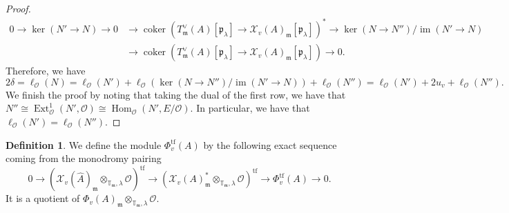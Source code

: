 \documentclass[a4paper, notitlepage, 10pt]{amsart}
\theoremstyle{plain} %
\theoremstyle{definition} %
\newtheorem{definition}[theorem]{Definition}
\theoremstyle{remark} %
\numberwithin{equation}{section}
\newcommand{\bbT}{\mathbb T}
\newcommand{\Ext}{\operatorname{Ext}} %
\newcommand{\coker}{\operatorname{coker}} %
\newcommand{\Hom}{\operatorname{Hom}} %
\newcommand{\im}{\operatorname{im}} %
\newcommand{\tf}{\operatorname{tf}} %
\begin{document}
\begin{proof}
\begin{align*}
        0 \to \ker( N'\to N) \to 0 &\to \coker( T^\vee_{\mathfrak{m}}(A)[\mathfrak{p}_\lambda] \to \mathcal{X}_v(A)_{\mathfrak{m}}[\mathfrak{p}_\lambda])^* \to \ker(N\to N'')/\im(N'\to N)
        \\ &\to \coker( T^\vee_{\mathfrak{m}}(A)[\mathfrak{p}_\lambda] \to \mathcal{X}_v(A)_{\mathfrak{m}}[\mathfrak{p}_\lambda]) \to 0.
    \end{align*}
    Therefore, we have 
$$2\delta=\ell_{\mathcal{O}}(N)=\ell_{\mathcal{O}}(N')+\ell_{\mathcal{O}}(\ker(N\to N'')/\im(N'\to N))+\ell_{\mathcal{O}}(N'')= \ell_{\mathcal{O}}(N')+2u_v+\ell_{\mathcal{O}}(N'').$$
We finish the proof by noting that
taking the dual of the first row, we have that $N''\cong \Ext^1_{\mathcal{O}}(N',\mathcal{O})\cong \Hom_{\mathcal{O}}(N',E/\mathcal{O})$. In particular, we have that $\ell_{\mathcal{O}}(N')=\ell_{\mathcal{O}}(N'')$.
\end{proof}

\begin{definition}
    We define the module $\Phi^{\tf}_v(A)$ by the following exact sequence coming from the monodromy pairing
\begin{equation}\label{mondromypairingatf}
     0 \to (\mathcal{X}_v(\hat{A})_{\mathfrak{m}}\otimes_{\bbT_{\mathfrak{m}},\lambda}\mathcal{O})^{\tf}\to (\mathcal{X}_v(A)_{\mathfrak{m}}^*\otimes_{\bbT_{\mathfrak{m}},\lambda}\mathcal{O})^{\tf}\to \Phi^{\tf}_v(A) \to 0.
\end{equation}
It is a quotient of $\Phi_v(A)_{\mathfrak{m}}\otimes_{\bbT_{\mathfrak{m}},\lambda}\mathcal{O}$.
\end{definition}
\end{document}
